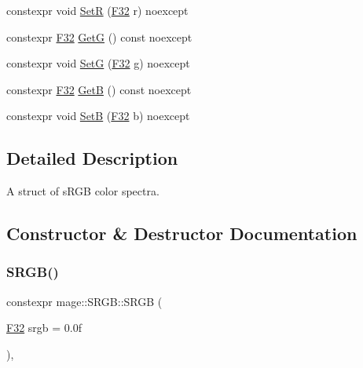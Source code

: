 \begin{DoxyCompactItemize}
\item 
constexpr void \mbox{\hyperlink{structmage_1_1_s_r_g_b_a0192829933892af3b9999653b7c976d2}{SetR}} (\mbox{\hyperlink{namespacemage_aa97e833b45f06d60a0a9c4fc22ae02c0}{F32}} r) noexcept
\item 
constexpr \mbox{\hyperlink{namespacemage_aa97e833b45f06d60a0a9c4fc22ae02c0}{F32}} \mbox{\hyperlink{structmage_1_1_s_r_g_b_a32cd65345a812c31b182d6ccaa47bab6}{GetG}} () const noexcept
\item 
constexpr void \mbox{\hyperlink{structmage_1_1_s_r_g_b_aba08d8f596cf38d8498fd9a5f5cfd998}{SetG}} (\mbox{\hyperlink{namespacemage_aa97e833b45f06d60a0a9c4fc22ae02c0}{F32}} g) noexcept
\item 
constexpr \mbox{\hyperlink{namespacemage_aa97e833b45f06d60a0a9c4fc22ae02c0}{F32}} \mbox{\hyperlink{structmage_1_1_s_r_g_b_afc01b8a11b3033ba21e6c5945359a421}{GetB}} () const noexcept
\item 
constexpr void \mbox{\hyperlink{structmage_1_1_s_r_g_b_a502751aa0c7b737c65c6cc5922cb0382}{SetB}} (\mbox{\hyperlink{namespacemage_aa97e833b45f06d60a0a9c4fc22ae02c0}{F32}} b) noexcept
\end{DoxyCompactItemize}


\subsection{Detailed Description}
A struct of s\+R\+GB color spectra. 

\subsection{Constructor \& Destructor Documentation}
\mbox{\label{structmage_1_1_s_r_g_b_a5f1cc4d90aaa3801f1146eb767d45476}} 
\subsubsection{\texorpdfstring{S\+R\+G\+B()}{SRGB()}\hspace{0.1cm}{\footnotesize\ttfamily [1/6]}}
{\footnotesize\ttfamily constexpr mage\+::\+S\+R\+G\+B\+::\+S\+R\+GB (\begin{DoxyParamCaption}\item[{\mbox{\hyperlink{namespacemage_aa97e833b45f06d60a0a9c4fc22ae02c0}{F32}}}]{srgb = {\ttfamily 0.0f} }\end{DoxyParamCaption})\hspace{0.3cm}{\ttfamily [explicit]}, {\ttfamily [noexcept]}}

